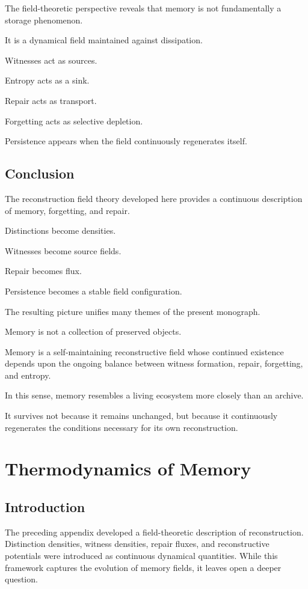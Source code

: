 \documentclass[12pt,oneside]{book}
\theoremstyle{plain} \newtheorem{theorem}{Theorem}[chapter] \newtheorem{lemma}[theorem]{Lemma} \newtheorem{proposition}[theorem]{Proposition} \newtheorem{corollary}[theorem]{Corollary}
\theoremstyle{definition} \newtheorem{definition}[theorem]{Definition} \newtheorem{axiom}[theorem]{Axiom} \newtheorem{construction}[theorem]{Construction}
\theoremstyle{remark} \newtheorem{remark}[theorem]{Remark} \newtheorem{example}[theorem]{Example}
\begin{document}
The field-theoretic perspective reveals that memory is not fundamentally a storage phenomenon.

It is a dynamical field maintained against dissipation.

Witnesses act as sources.

Entropy acts as a sink.

Repair acts as transport.

Forgetting acts as selective depletion.

Persistence appears when the field continuously regenerates itself.

\section{Conclusion}

The reconstruction field theory developed here provides a continuous description of memory, forgetting, and repair.

Distinctions become densities.

Witnesses become source fields.

Repair becomes flux.

Persistence becomes a stable field configuration.

The resulting picture unifies many themes of the present monograph.

Memory is not a collection of preserved objects.

Memory is a self-maintaining reconstructive field whose continued existence depends upon the ongoing balance between witness formation, repair, forgetting, and entropy.

In this sense, memory resembles a living ecosystem more closely than an archive.

It survives not because it remains unchanged, but because it continuously regenerates the conditions necessary for its own reconstruction.

\chapter{Thermodynamics of Memory}

\section{Introduction}

The preceding appendix developed a field-theoretic description of reconstruction. Distinction densities, witness densities, repair fluxes, and reconstructive potentials were introduced as continuous dynamical quantities. While this framework captures the evolution of memory fields, it leaves open a deeper question.
\end{document}
